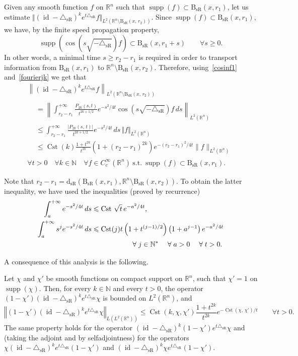 \documentclass[AHL,Unicode,published]{cedram}
\newcommand*\R{\mathbb{R}}
\newcommand*\N{\mathbb{N}}
\DeclareMathOperator{\supp}{supp}
\DeclareMathOperator{\Cst}{Cst}
\DeclareMathOperator{\id}{id}
\newcommand{\trianglesR}{\triangle_{\mathrm{sR}}}
\newcommand{\dsR}{\mathrm{d}_{\mathrm{sR}}}
\newcommand{\BsR}{\mathrm{B}_{\mathrm{sR}}}
\renewcommand{\geq}{\geqslant}
\renewcommand{\leq}{\leqslant}
\let\oldforall\forall
\renewcommand*{\forall}{\mathrel{\oldforall}}
\begin{document}
Given any smooth function $f$ on $\R^n$ such that $\supp(f)\subset\BsR(x,r_1)$, let us estimate $\Vert (\id-\trianglesR)^{k}e^{t\trianglesR} f\Vert_{L^2(\R^n\setminus \BsR(x,\,r_2))}$. Since $\supp(f)\subset \BsR(x,r_1)$, we have, by the finite speed propagation property,
\[
\supp\left(\cos\left(s\sqrt{-\trianglesR}\right) f\right) \subset \BsR(x,r_1+s)\qquad\forall s\geq 0.
\]
In other words, a minimal time $s\geq r_2-r_1$ is required in order to transport information from $\BsR(x,r_1)$ to $\R^n\setminus \BsR(x,r_2)$. Therefore, using~\eqref{cosinf1} and~\eqref{fourierjk} we get that
\begin{multline}\label{estimate_glob}
\left\|\left(\id-\trianglesR\right)^{k}  e^{t\trianglesR} f \right\|_{L^2\left(\R^n\setminus \BsR(x,\,r_2)\right)} \\
\begin{aligned}
& = \left\| \int_{r_2-r_1}^{+\infty} \frac{P_{2k}(s,t)}{t^{2k+1/2}} e^{-s^2/4t} \cos\left(s\sqrt{-\trianglesR}\right)f\, ds \right\|_{L^2\left(\R^n\right)} \\
&\leq \int_{r_2-r_1}^{+\infty} \frac{\vert P_{2k}(s,\,t)\vert}{t^{2k+1/2}} e^{-s^2/4t}\, ds\, \Vert f\Vert_{L^2\left(\R^n\right)} \\
&\leq \Cst(k)\frac{1+t^{2k}}{t^{2k}} \left(1+(r_2-r_1)^{2k}\right) e^{-(r_2-r_1)^2/4t} \| f\|_{L^2\left(\R^n\right)} 
\end{aligned}
\\[2mm]
\forall t>0 \quad \forall k\in\N\quad \forall f\in C_c^\infty\left(\R^n\right) \ \text{s.t.}\ \supp(f)\subset \BsR(x,r_1).
\end{multline}
\vspace{2em}

Note that $r_2-r_1 = \dsR(\BsR(x,r_1),\R^n\setminus \BsR(x,r_2))$. To obtain the latter inequality, we have used the inequalities (proved by recurrence)
\begin{align*}
\int_a^{+\infty} e^{-s^2/4t}\, ds &\leq \Cst \, \sqrt{t}\, e^{-a^2/4t}, \\
\int_a^{+\infty} s^j e^{-s^2/4t}\, ds &\leq \Cst(j) t \left(1+t^{(j-1)/2}\right)\left(1+a^{j-1}\right) e^{-a^2/4t}\\
& \mkern100mu \forall j\in\N^*\quad \forall a>0\quad \forall t>0.
\end{align*}

A consequence of this analysis is the following.

\begin{prop}
Let $\chi$ and $\chi'$ be smooth functions on compact support on $\R^n$, such that $\chi'=1$ on $\supp(\chi)$. Then, for every $k\in\N$ and every $t>0$, the operator $(1-\chi') (\id-\trianglesR)^{k}e^{t\trianglesR} \chi$ is bounded on $L^2(\R^n)$, and
\[
\left\Vert (1-\chi') (\id-\trianglesR)^{k}e^{t\trianglesR} \chi \right\Vert_{L\left(L^2\left(\R^n\right)\right)}
\leq \Cst(k,\chi,\chi')\frac{1+t^{2k}}{t^{2k}} e^{-\Cst(\chi,\,\chi')/t} \qquad\forall t>0.
\]
The same property holds for the operator $(\id-\trianglesR)^{k}(1-\chi')e^{t\trianglesR} \chi$ and (taking the adjoint and by selfadjointness) for the operators $\chi (\id-\trianglesR)^{k}e^{t\trianglesR} (1-\chi')$ and $(\id-\trianglesR)^{k} \chi e^{t\trianglesR} (1-\chi')$.
\end{prop}
\end{document}
